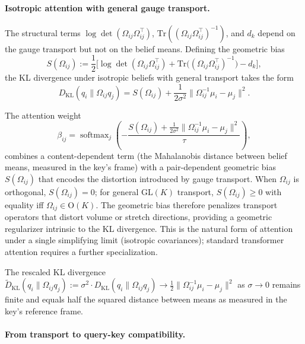 \documentclass[11pt]{article}
\begin{document}
\paragraph{Isotropic attention with general gauge transport.}

The structural terms $\log\det(\Omega_{ij}\Omega_{ij}^\top)$, $\mathrm{Tr}((\Omega_{ij}\Omega_{ij}^\top)^{-1})$, and $d_k$ depend on the gauge transport but not on the belief means. Defining the geometric bias
\begin{equation}
S(\Omega_{ij}) := \frac{1}{2}\Big[\log\det(\Omega_{ij}\Omega_{ij}^\top) + \mathrm{Tr}\big((\Omega_{ij}\Omega_{ij}^\top)^{-1}\big) - d_k\Big],
\end{equation}
the KL divergence under isotropic beliefs with general transport takes the form
\begin{equation}
D_{\mathrm{KL}}(q_i \| \Omega_{ij} q_j) = S(\Omega_{ij}) + \frac{1}{2\sigma^2}\|\Omega_{ij}^{-1}\mu_i - \mu_j\|^2.
\end{equation}

The attention weight
\begin{equation}
\beta_{ij} = \operatorname{softmax}_j\left(-\frac{S(\Omega_{ij}) + \frac{1}{2\sigma^2}\|\Omega_{ij}^{-1}\mu_i - \mu_j\|^2}{\tau}\right),
\end{equation}
combines a content-dependent term (the Mahalanobis distance between belief means, measured in the key's frame) with a pair-dependent geometric bias $S(\Omega_{ij})$ that encodes the distortion introduced by gauge transport. When $\Omega_{ij}$ is orthogonal, $S(\Omega_{ij}) = 0$; for general $\mathrm{GL}(K)$ transport, $S(\Omega_{ij}) \geq 0$ with equality iff $\Omega_{ij} \in \mathrm{O}(K)$. The geometric bias therefore penalizes transport operators that distort volume or stretch directions, providing a geometric regularizer intrinsic to the KL divergence. This is the natural form of attention under a single simplifying limit (isotropic covariances); standard transformer attention requires a further specialization.

The rescaled KL divergence $\widetilde{D}_{\mathrm{KL}}(q_i \| \Omega_{ij}q_j) := \sigma^2 \cdot D_{\mathrm{KL}}(q_i \| \Omega_{ij}q_j) \to \frac{1}{2}\|\Omega_{ij}^{-1}\mu_i - \mu_j\|^2$ as $\sigma \to 0$ remains finite and equals half the squared distance between means as measured in the key's reference frame.

\paragraph{From transport to query-key compatibility.}
\end{document}
